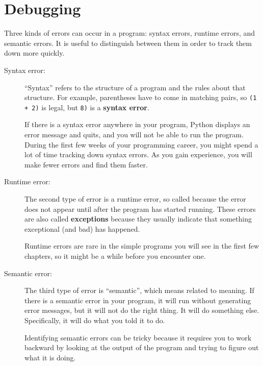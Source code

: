 \documentclass[10pt]{book}
\begin{document}
\section{Debugging}

Three kinds of errors can occur in a program: syntax errors, runtime 
errors, and semantic errors.  It is useful
to distinguish between them in order to track them down more quickly.

\begin{description}

\item[Syntax error:] ``Syntax'' refers to the structure of a program
  and the rules about that structure.  For example, parentheses have
  to come in matching pairs, so {\tt (1 + 2)} is legal, but {\tt 8)}
  is a {\bf syntax error}.   

If there is a syntax error
anywhere in your program, Python displays an error message and quits,
and you will not be able to run the program.  During the first few
weeks of your programming career, you might spend a lot of
time tracking down syntax errors.  As you gain experience, you will
make fewer errors and find them faster.


\item[Runtime error:] The second type of error is a runtime error, so
  called because the error does not appear until after the program has
  started running.  These errors are also called {\bf exceptions}
  because they usually indicate that something exceptional (and bad)
  has happened.   
    

Runtime errors are rare in the simple programs you will see in the
first few chapters, so it might be a while before you encounter one.


\item[Semantic error:] The third type of error is ``semantic'', which
  means related to meaning.  If there is a semantic error in your
  program, it will run without generating error messages, but it will
  not do the right thing.  It will do something else.  Specifically,
  it will do what you told it to do.  
   

Identifying semantic errors can be tricky because it requires you to work
backward by looking at the output of the program and trying to figure
out what it is doing.

\end{description}
\end{document}
